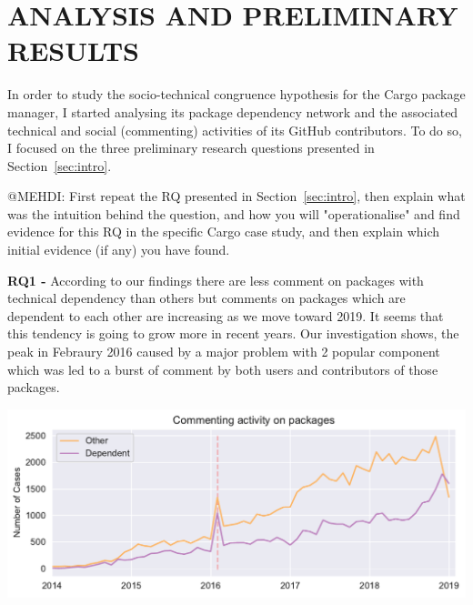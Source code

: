 \section{ANALYSIS AND PRELIMINARY RESULTS}

In order to study the socio-technical congruence hypothesis for the Cargo package manager, I started analysing its package dependency network and the associated technical and social (commenting) activities of its GitHub contributors.
To do so, I focused on the three preliminary research questions presented in Section~\ref{sec:intro}.



{\color{red}@MEHDI: First repeat the RQ presented in Section~\ref{sec:intro}, then explain what was the intuition behind the question, and how you will "operationalise" and find evidence for this RQ in the specific Cargo case study, and then explain which initial evidence (if any) you have found.}
  
  
\textbf{RQ1 - }According to our findings there are less comment on packages with technical dependency than others but comments on packages which are dependent to each other are increasing as we move toward 2019. It seems that this tendency is going to grow more in recent years. Our investigation shows, the peak in Febraury 2016 caused by a major problem with 2 popular component which was led to a burst of comment by both users and contributors of those packages.

\includegraphics[width=\columnwidth]{Photos/RQ1_1.pdf} 